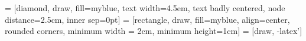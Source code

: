 \usepackage[table]{xcolor} 

\usepackage{tikz}
 = [diamond, draw, fill=myblue, text width=4.5em, text badly centered, node distance=2.5cm, inner sep=0pt]
 = [rectangle, draw, fill=myblue, align=center, rounded corners, minimum width = 2cm, minimum height=1cm]
 = [draw, -latex']
